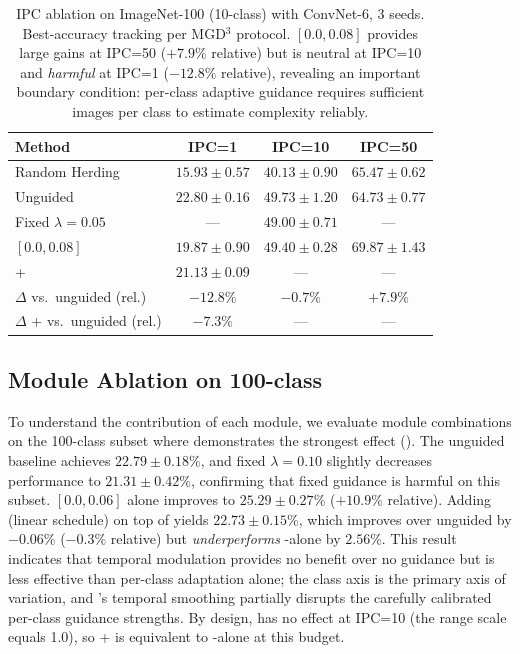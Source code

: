 \begin{table}[t]
\centering
\caption{IPC ablation on ImageNet-100 (10-class) with ConvNet-6, 3 seeds. Best-accuracy tracking per MGD$^3$ protocol. \cags{} $[0.0, 0.08]$ provides large gains at IPC=50 ($+7.9\%$ relative) but is neutral at IPC=10 and \emph{harmful} at IPC=1 ($-12.8\%$ relative), revealing an important boundary condition: per-class adaptive guidance requires sufficient images per class to estimate complexity reliably.}
\label{tab:ipc-ablation-10cls}
\begin{tabular}{lccc}
\toprule
\textbf{Method} & \textbf{IPC=1} & \textbf{IPC=10} & \textbf{IPC=50} \\
\midrule
Random Herding & $15.93 \pm 0.57$ & $40.13 \pm 0.90$ & $65.47 \pm 0.62$ \\
Unguided & $22.80 \pm 0.16$ & $49.73 \pm 1.20$ & $64.73 \pm 0.77$ \\
Fixed $\lambda = 0.05$ & --- & $49.00 \pm 0.71$ & --- \\
\cags{} $[0.0, 0.08]$ & $19.87 \pm 0.90$ & $49.40 \pm 0.28$ & $\mathbf{69.87 \pm 1.43}$ \\
\iast{}+\cags{} & $21.13 \pm 0.09$ & --- & --- \\
\midrule
$\Delta$ \cags{} vs.\ unguided (rel.) & $-12.8\%$ & $-0.7\%$ & $+7.9\%$ \\
$\Delta$ \iast{}+\cags{} vs.\ unguided (rel.) & $-7.3\%$ & --- & --- \\
\bottomrule
\end{tabular}
\end{table}

\subsection{Module Ablation on 100-class}
\label{sec:module-ablation}

To understand the contribution of each \ags{} module, we evaluate module combinations on the 100-class subset where \cags{} demonstrates the strongest effect (). The unguided baseline achieves $22.79 \pm 0.18\%$, and fixed $\lambda = 0.10$ slightly decreases performance to $21.31 \pm 0.42\%$, confirming that fixed guidance is harmful on this subset. \cags{} $[0.0, 0.06]$ alone improves to $25.29 \pm 0.27\%$ ($+10.9\%$ relative). Adding \tags{} (linear schedule) on top of \cags{} yields $22.73 \pm 0.15\%$, which improves over unguided by $-0.06\%$ ($-0.3\%$ relative) but \emph{underperforms} \cags{}-alone by $2.56\%$. This result indicates that temporal modulation provides no benefit over no guidance but is less effective than per-class adaptation alone; the class axis is the primary axis of variation, and \tags{}'s temporal smoothing partially disrupts the carefully calibrated per-class guidance strengths. By design, \iast{} has no effect at IPC=10 (the range scale equals 1.0), so \iast{}+\cags{} is equivalent to \cags{}-alone at this budget.

